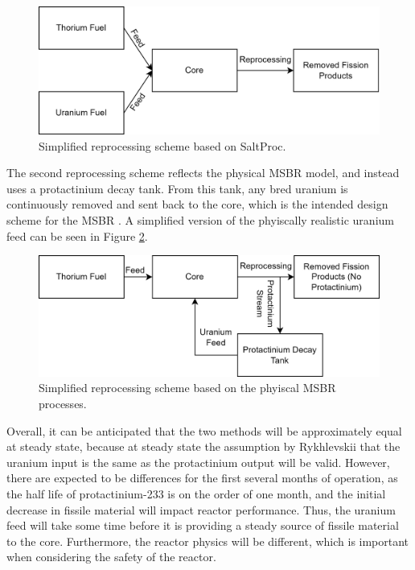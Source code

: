 \begin{figure}[H]
  \centering
  \includegraphics[scale=0.15]{images/sp-match-repr-scheme.png}
  \caption{Simplified reprocessing scheme based on SaltProc.}
   \label{fig:spmatchrepr}
\end{figure}

The second reprocessing scheme reflects the physical MSBR model, and instead uses a protactinium decay tank. From this tank, any bred uranium is continuously removed and sent back to the core, which is the intended design scheme for the MSBR \cite{robertson_conceptual_1971}. A simplified version of the phyiscally realistic uranium feed can be seen in Figure \ref{fig:nonspmatchrepr}.

\begin{figure}[H]
  \centering
  \includegraphics[scale=0.15]{images/phys-repr-scheme.png}
  \caption{Simplified reprocessing scheme based on the phyiscal MSBR processes.}
   \label{fig:nonspmatchrepr}
\end{figure}

Overall, it can be anticipated that the two methods will be approximately equal at steady state, because at steady state the assumption by Rykhlevskii that the uranium input is the same as the protactinium output will be valid. However, there are expected to be differences for the first several months of operation, as the half life of protactinium-233 is on the order of one month, and the initial decrease in fissile material will impact reactor performance. Thus, the uranium feed will take some time before it is providing a steady source of fissile material to the core. Furthermore, the reactor physics will be different, which is important when considering the safety of the reactor.







